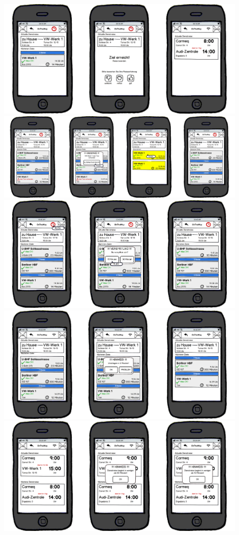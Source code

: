 \documentclass{article}
\begin{document}
\begin{center}
\includegraphics[width=12cm]{08_konvergenter_paperprototyp01_007.png}\\
\includegraphics[width=12cm]{08_konvergenter_paperprototyp01_008.png}\\
\includegraphics[width=12cm]{08_konvergenter_paperprototyp01_009.png}\\
\includegraphics[width=12cm]{08_konvergenter_paperprototyp01_010.png}\\
\includegraphics[width=12cm]{08_konvergenter_paperprototyp01_011.png}\\

\end{center}
\end{document}
